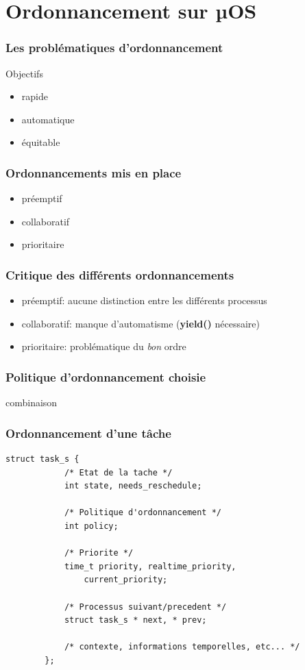 \documentclass{beamer}
\begin{document}
\section{Ordonnancement sur µOS}

\begin{frame}
    \frametitle{Les problématiques d'ordonnancement}
    \begin{center}
        \huge Objectifs
    \end{center}
    \begin{itemize}
        \item<2-> rapide
        \item<3-> automatique
        \item<4-> équitable
    \end{itemize}
\end{frame}

\begin{frame}
    \frametitle{Ordonnancements mis en place}
    \begin{itemize}
        \item<2-> préemptif
        \item<3-> collaboratif
        \item<4-> prioritaire
    \end{itemize}
\end{frame}

\begin{frame}
    \frametitle{Critique des différents ordonnancements}
    \begin{itemize}
        \item préemptif: aucune distinction entre les différents processus
        \item collaboratif: manque d'automatisme (\textbf{yield()} nécessaire)
        \item prioritaire: problématique du \emph{bon} ordre
    \end{itemize}
\end{frame}

\begin{frame}
    \frametitle{Politique d'ordonnancement choisie}
    \begin{center}
        \huge combinaison
    \end{center}
\end{frame}

\begin{frame}[fragile]
    \frametitle{Ordonnancement d'une tâche}
    \begin{lstlisting}[caption=Représentation structurelle d'un processus]
        struct task_s {
            /* Etat de la tache */
            int state, needs_reschedule;

            /* Politique d'ordonnancement */
            int policy;

            /* Priorite */
            time_t priority, realtime_priority,
                current_priority;

            /* Processus suivant/precedent */
            struct task_s * next, * prev;

            /* contexte, informations temporelles, etc... */
        };
    \end{lstlisting}
\end{frame}
\end{document}
